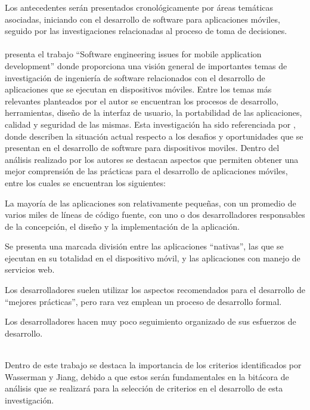Los antecedentes serán presentados cronológicamente por áreas temáticas asociadas, iniciando con el desarrollo de software para aplicaciones móviles, seguido por las investigaciones relacionadas al proceso de toma de decisiones.\\  
\\
\citet{wasserman2010software} presenta el trabajo ``Software engineering issues for mobile application development'' donde proporciona una visión general de importantes temas de investigación de ingeniería de software relacionados con el desarrollo de aplicaciones que se ejecutan en dispositivos móviles. Entre los temas más relevantes planteados por el autor se encuentran los procesos de desarrollo, herramientas, diseño de la interfaz de usuario, la portabilidad de las aplicaciones, calidad y seguridad de las mismas. Esta investigación ha sido referenciada por \citet{jiang2015software}, donde describen la situación actual respecto a los desafios y oportunidades que se presentan en el desarrollo de software para dispositivos moviles.  Dentro del análisis realizado por los autores se destacan aspectos que permiten obtener una mejor comprensión de las prácticas para el desarrollo de aplicaciones móviles, entre los cuales se encuentran los siguientes:
\begin{enumeracion}
\item La mayoría de las aplicaciones son relativamente pequeñas, con un promedio de varios miles de líneas de código fuente, con uno o dos desarrolladores responsables de la concepción, el diseño y la implementación de la aplicación.
\item Se presenta una marcada división entre las aplicaciones ``nativas'', las que se ejecutan en su totalidad en el dispositivo móvil, y las aplicaciones con manejo de servicios web.
\item Los desarrolladores suelen utilizar los aspectos recomendados para el desarrollo de ``mejores prácticas'', pero rara vez emplean un proceso de desarrollo formal.
\item Los desarrolladores hacen muy poco seguimiento organizado de sus esfuerzos de desarrollo.
\end{enumeracion}
\\
Dentro de este trabajo  se destaca la importancia de los criterios identificados por Wasserman y Jiang, debido a que estos serán fundamentales en la bitácora de análisis que se realizará para la selección de criterios en el desarrollo de esta investigación.\\

